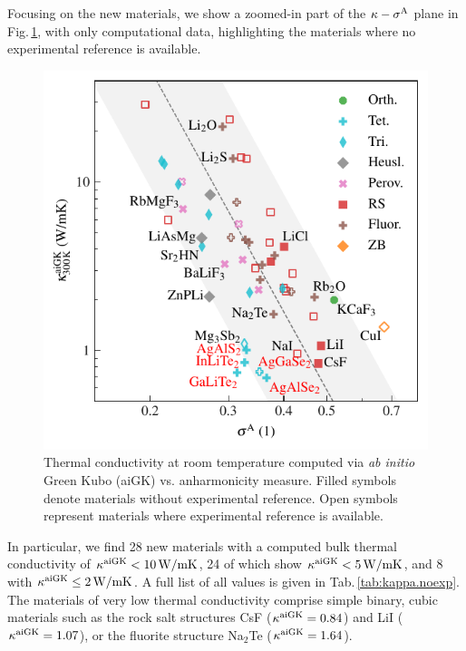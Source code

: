 Focusing on the new materials, we show a zoomed-in part of the $\kappa-\sigma^\mathrm{A}$ plane in Fig.\,\ref{fig:kappa_sigma}, with only computational data, highlighting the materials where no experimental reference is available.
%
\begin{figure}
	\includegraphics[width=\textwidth]{./data/plots/kappa_vs_sigma_trusted/kappa_vs_sigma_trusted_experiment.pdf}
	\caption{Thermal conductivity at room temperature computed via \emph{ab initio} Green Kubo (aiGK) vs. anharmonicity measure. Filled symbols denote materials without experimental reference. Open symbols represent materials where experimental reference is available.}
	\label{fig:kappa_sigma}
\end{figure}
%
In particular, we find 28 new materials with a computed bulk thermal conductivity of $\kappa^{\rm aiGK} < 10\,{\rm W/mK}$, 24 of which show $\kappa^{\rm aiGK} < 5\,{\rm W/mK}$, and 8 with $\kappa^{\rm aiGK} \leq 2\,{\rm W/mK}$. A full list of all values is given in Tab.\,\ref{tab:kappa.noexp}. The materials of very low thermal conductivity comprise simple binary, cubic materials such as the rock salt structures CsF ($\kappa^{\rm aiGK} = 0.84$) and LiI ($\kappa^{\rm aiGK} = 1.07$), or the fluorite structure Na$_2$Te ($\kappa^{\rm aiGK} = 1.64$). 

